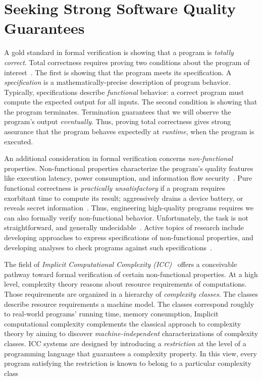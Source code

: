 \section{Seeking Strong Software Quality Guarantees}
\label{sec:aicc-intro}

A gold standard in formal verification is showing that a program is \emph{totally correct}.
Total correctness requires proving two conditions about the program of interest~\cite{leino2023}.
The first is showing that the program meets its specification.
A \emph{specification} is a mathematically-precise description of program behavior.
Typically, specifications describe \emph{functional} behavior: a correct program must compute the expected output for all inputs.
The second condition is showing that the program terminates.
Termination guarantees that we will observe the program's output \emph{eventually}.
Thus, proving total correctness gives strong assurance that the program behaves expectedly at \emph{runtime}, when the program is executed.

An additional consideration in formal verification concerns \emph{non-functional} properties.
Non-functional properties characterize the program's quality features like execution latency, power consumption, and information flow security~\cite{terbeek2018}.
Pure functional correctness is \emph{practically unsatisfactory} if a program requires exorbitant time to compute its result;
aggressively drains a device battery, or reveals secret information~\cite{heraud2011,aubert20222}.
Thus, engineering high-quality programs requires we can also formally verify non-functional behavior.
Unfortunately, the task is not straightforward, and generally undecidable~\cite{rice1953}.
Active topics of research include developing approaches to express specifications of non-functional properties, and developing analyses to check programs against such specifications~\cite{etaps2025}.

The field of \emph{Implicit Computational Complexity (ICC)}~\cite{dallago2011} offers a conceivable pathway toward formal verification of certain non-functional properties.
At a high level, complexity theory reasons about resource requirements of computations.
Those requirements are organized in a hierarchy of \emph{complexity classes}.
The classes describe resource requirements \wrt a machine model.
The classes correspond roughly to real-world programs' running time, memory consumption, \etc
Implicit computational complexity complements the classical approach to complexity theory by aiming to discover \emph{machine-independent} characterizations of complexity classes.
ICC systems are designed by introducing a \emph{restriction} at the level of a programming language that guarantees a complexity property.
In this view, every program satisfying the restriction is known to belong to a particular complexity class~\cite{pchoux2020}%

